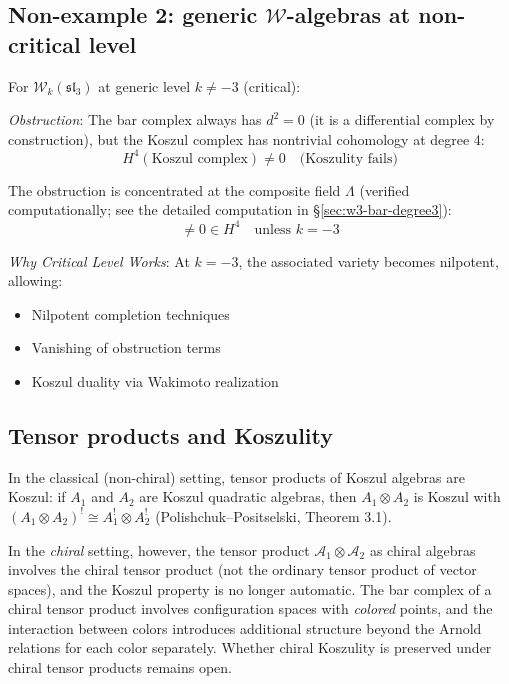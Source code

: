 \subsection{Non-example 2: generic $\mathcal{W}$-algebras at non-critical level}

\begin{remark}
For $\mathcal{W}_k(\mathfrak{sl}_3)$ at generic level $k \neq -3$ (critical):

\emph{Obstruction}: The bar complex always has $d^2 = 0$ (it is a differential complex by construction), but the Koszul complex has nontrivial cohomology at degree 4:
\begin{equation}
H^4(\text{Koszul complex}) \neq 0 \quad \text{(Koszulity fails)}
\end{equation}

The obstruction is concentrated at the composite field $\Lambda$ (verified computationally; see the detailed computation in \S\ref{sec:w3-bar-degree3}):
\begin{equation}
[\Lambda] \neq 0 \in H^4 \quad \text{unless } k = -3
\end{equation}

\emph{Why Critical Level Works}:
At $k = -3$, the associated variety becomes nilpotent, allowing:
\begin{itemize}
\item Nilpotent completion techniques
\item Vanishing of obstruction terms
\item Koszul duality via Wakimoto realization
\end{itemize}
\end{remark}

\subsection{Tensor products and Koszulity}

\begin{remark}
In the classical (non-chiral) setting, tensor products of Koszul algebras are Koszul: if $A_1$ and $A_2$ are Koszul quadratic algebras, then $A_1 \otimes A_2$ is Koszul with $(A_1 \otimes A_2)^! \cong A_1^! \otimes A_2^!$ (Polishchuk--Positselski, Theorem 3.1).

In the \emph{chiral} setting, however, the tensor product $\mathcal{A}_1 \otimes \mathcal{A}_2$ as chiral algebras involves the chiral tensor product (not the ordinary tensor product of vector spaces), and the Koszul property is no longer automatic. The bar complex of a chiral tensor product involves configuration spaces with \emph{colored} points, and the interaction between colors introduces additional structure beyond the Arnold relations for each color separately. Whether chiral Koszulity is preserved under chiral tensor products remains open.
\end{remark}

